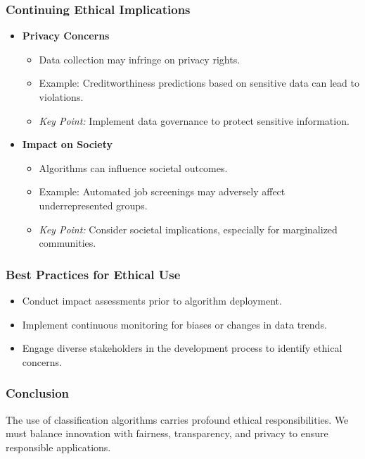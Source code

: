 \documentclass[aspectratio=169]{beamer}
\begin{document}
\begin{frame}[fragile]
    \frametitle{Continuing Ethical Implications}
    \begin{itemize}
        \item \textbf{Privacy Concerns}
            \begin{itemize}
                \item Data collection may infringe on privacy rights.
                \item Example: Creditworthiness predictions based on sensitive data can lead to violations.
                \item \textit{Key Point:} Implement data governance to protect sensitive information.
            \end{itemize}
        
        \item \textbf{Impact on Society}
            \begin{itemize}
                \item Algorithms can influence societal outcomes.
                \item Example: Automated job screenings may adversely affect underrepresented groups.
                \item \textit{Key Point:} Consider societal implications, especially for marginalized communities.
            \end{itemize}
    \end{itemize}
\end{frame}

\begin{frame}[fragile]
    \frametitle{Best Practices for Ethical Use}
    \begin{itemize}
        \item Conduct impact assessments prior to algorithm deployment.
        \item Implement continuous monitoring for biases or changes in data trends.
        \item Engage diverse stakeholders in the development process to identify ethical concerns.
    \end{itemize}
\end{frame}

\begin{frame}[fragile]
    \frametitle{Conclusion}
    The use of classification algorithms carries profound ethical responsibilities. We must balance innovation with fairness, transparency, and privacy to ensure responsible applications.
\end{frame}
\end{document}

